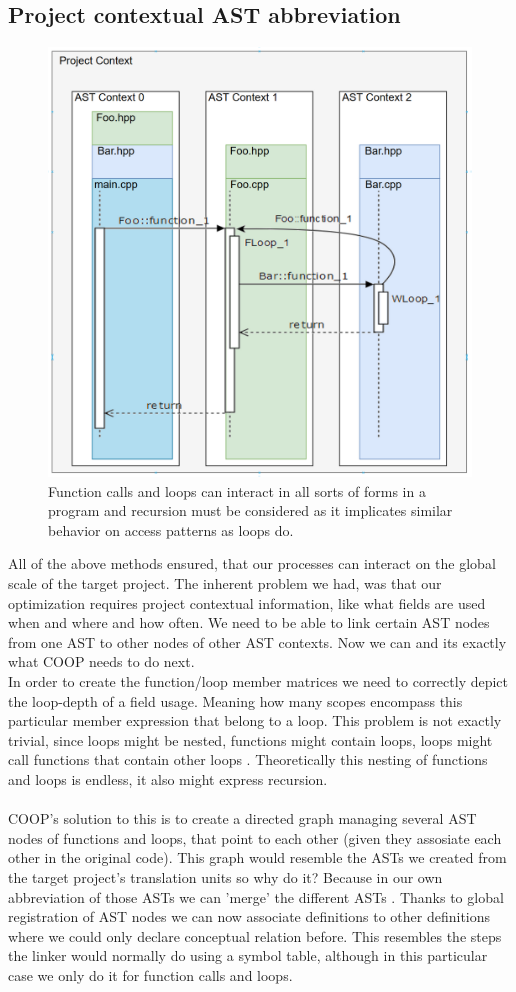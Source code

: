 \subsection{Project contextual AST abbreviation}
\begin{figure}
	\centering
	\includegraphics[width=.6\textwidth, height=0.42\textwidth]{PICs/recursion_context}
	\caption{Function calls and loops can interact in all sorts of forms in a program and recursion must be considered as it implicates similar behavior on access patterns as loops do.}\label{recursion}
\end{figure}
All of the above methods ensured, that our processes can interact on the global scale of the target project. The inherent problem we had, was that our optimization requires project contextual information, like what fields are used when and where and how often. We need to be able to link certain AST nodes from one AST to other nodes of other AST contexts. Now we can and its exactly what COOP needs to do next.\\
In order to create the function/loop member matrices we need to correctly depict the loop-depth of a field usage. Meaning how many scopes encompass this particular member expression that belong to a loop. This problem is not exactly trivial, since loops might be nested, functions might contain loops, loops might call functions that contain other loops . Theoretically this nesting of functions and loops is endless, it also might express recursion.\\\\
COOP's solution to this is to create a directed graph managing several AST nodes of functions and loops, that point to each other (given they assosiate each other in the original code). This graph would resemble the ASTs we created from the target project's translation units so why do it? Because in our own abbreviation of those ASTs we can 'merge' the different ASTs . Thanks to global registration of AST nodes we can now associate definitions to other definitions where we could only declare conceptual relation before. This resembles the steps the linker would normally do using a symbol table, although in this particular case we only do it for function calls and loops.\\
